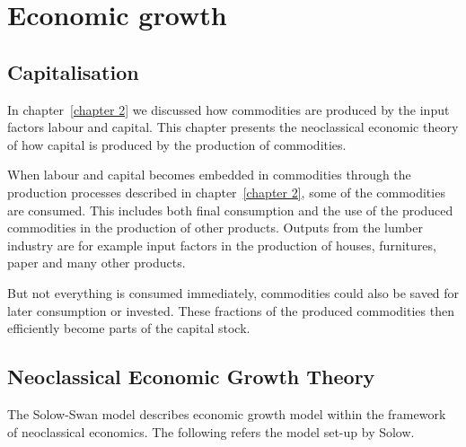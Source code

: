 \documentclass[11pt,fleqn]{book} %
\begin{document}

\chapter{Economic growth} \label{chapter 8a}
\section{Capitalisation}

In chapter~\ref{chapter 2} we discussed how commodities are produced by the input factors labour and capital. This chapter presents the neoclassical economic theory of how capital is produced by the production of commodities.

When labour and capital becomes embedded in commodities through the production processes described in chapter~\ref{chapter 2}, some of the commodities are consumed. This includes both final consumption and the use of the produced commodities in the production of other products. Outputs from the lumber industry are for example input factors in the production of houses, furnitures, paper and many other products.

But not everything is consumed immediately, commodities could also be saved for later consumption or invested. These fractions of the produced commodities then efficiently become parts of the capital stock.

\section{Neoclassical Economic Growth Theory}

The Solow-Swan model describes economic growth model within the framework of neoclassical economics. The following refers the model set-up by Solow\cite{Solow1956}.
\end{document}
